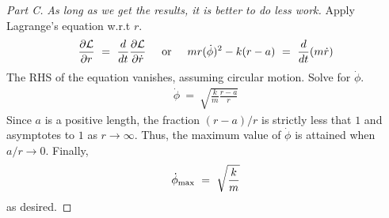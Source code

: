 \documentclass{article}
\numberwithin{equation}{section}
\newcommand{\textOr}{
    {
        \hspace{5mm}
        \textrm{or}
        \hspace{5mm}
    }
}
\newcommand{\deriv}[2]{
\frac {d {#1} } {d {#2}}
}
\newcommand{\pderiv}[2]{
\frac {\partial {#1} } {\partial {#2}}
}
\begin{document}
\begin{proof} [Part C]
    \textit{As long as we get the results, it is better to do less work. }
    Apply Lagrange's equation w.r.t $r$. 
    \begin{align}
        \pderiv{\mathcal L}{r} \ = \ \deriv{}{t} \pderiv{\mathcal L}{\dot r} 
        \textOr 
        m r (\dot \phi)^2 - k (r - a) \ = \ \deriv{}{t} (m \dot r)
    \end{align}
    The RHS of the equation vanishes, assuming circular motion. Solve for $\dot \phi$. 
    \begin{align}
        \dot \phi \ = \ \sqrt{
            \frac k m \frac {r - a} r
        }
    \end{align}
    Since $a$ is a positive length, the fraction $(r-a)/r$ is strictly 
    less that $1$ and asymptotes to $1$ as $r \rightarrow \infty$. 
    Thus, the maximum value of $\dot \phi$ is attained when $a/r \rightarrow 0$. 
    Finally, 
    \begin{align}
        \dot \phi_{\rm max} \ = \ \sqrt{\frac k m} 
    \end{align}
    as desired. 
\end{proof}
\end{document}
